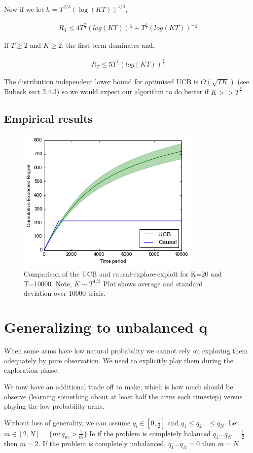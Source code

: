 \documentclass{article}
\newcommand{\eqn}[1]{\begin{align}#1\end{align}}
\theoremstyle{plain}
\theoremstyle{definition}
\begin{document}
Now if we let $h = T^{2/3}(\log(KT))^{1/3}$,


\eqn {
R_T \leq 4T^{\frac{2}{3}}(log(KT))^{\frac{1}{3}} + T^{\frac{1}{3}}(log(KT))^{-\frac{1}{3}}
}

If $T \geq 2$ and $K \geq 2$, the first term dominates and,

\eqn {
R_T  \leq 5T^{\frac{2}{3}}(log(KT))^{\frac{1}{3}}
}

The distribution independent lower bound for optimised UCB is $O(\sqrt{TK})$ (see Bubeck sect 2.4.3) so we would expect our algorithm to do better if $K >> T^{\frac{1}{3}}$



\subsection*{Empirical results}
\begin{figure}[H]
\centering
\caption{Comparison of the UCB and causal-explore-exploit for K=20 and T=10000. Note, $K \sim T^{1/3}$ Plot shows average and standard deviation over 10000 trials.}
\includegraphics[width=.5\textwidth]{explore_exploit}
\end{figure}

\section{Generalizing to unbalanced $\boldsymbol{q}$}

When some arms have low natural probability we cannot rely on exploring them adequately by pure observation. We need to explicitly play them during the exploration phase. 

We now have an additional trade off to make, which is how much should be observe (learning something about at least half the arms each timestep) versus playing the low probability arms. 

Without loss of generality, we can assume $q_i \in [0,\frac{1}{2}]$ and $q_1 \leq q_2 ... \leq q_N$. Let $m \in [2,N] = \{m:q_m > \frac{1}{m}\}$ Ie if the problem is completely balanced $q_1...q_N = \frac{1}{2}$ then $m = 2$. If the problem is completely unbalanced, $q_1...q_N = 0$ then $m=N$
\end{document}
